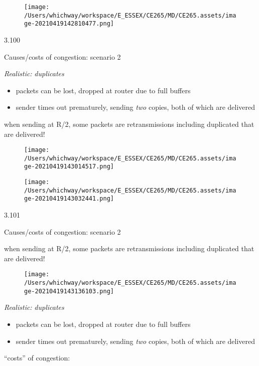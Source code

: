 \documentclass[
]{article}
\begin{document}
\begin{figure}
\centering
\texttt{[image: /Users/whichway/workspace/E\_ESSEX/CE265/MD/CE265.assets/image-20210419142810477.png]}
\caption{}
\end{figure}

3.100

Causes/costs of congestion: scenario 2

\emph{Realistic:} \emph{duplicates}

\begin{itemize}
\item
  packets can be lost, dropped at router due to full buffers
\item
  sender times out prematurely, sending \emph{two} copies, both of which
  are delivered
\end{itemize}

when sending at R/2, some packets are retransmissions including
duplicated that are delivered!

\begin{figure}
\centering
\texttt{[image: /Users/whichway/workspace/E\_ESSEX/CE265/MD/CE265.assets/image-20210419143014517.png]}
\caption{}
\end{figure}

\begin{figure}
\centering
\texttt{[image: /Users/whichway/workspace/E\_ESSEX/CE265/MD/CE265.assets/image-20210419143032441.png]}
\caption{}
\end{figure}

3.101

Causes/costs of congestion: scenario 2

when sending at R/2, some packets are retransmissions including
duplicated that are delivered!

\begin{figure}
\centering
\texttt{[image: /Users/whichway/workspace/E\_ESSEX/CE265/MD/CE265.assets/image-20210419143136103.png]}
\caption{}
\end{figure}

\emph{Realistic:} \emph{duplicates}

\begin{itemize}
\item
  packets can be lost, dropped at router due to full buffers
\item
  sender times out prematurely, sending \emph{two} copies, both of which
  are delivered
\end{itemize}

``costs'' of congestion:
\end{document}
